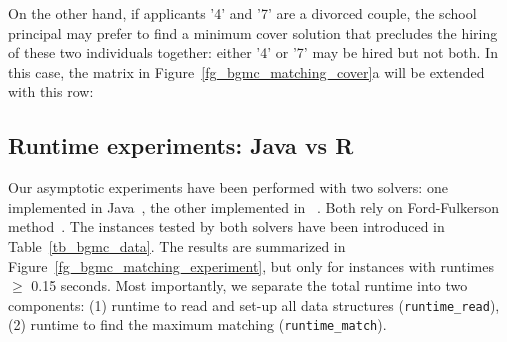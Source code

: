 On the other hand,  if applicants '4' and '7' are a divorced couple,
the school principal may prefer to find a minimum cover solution that
precludes the hiring of these two individuals together: either 
'4' or '7' may be hired but not both. In this case, 
the matrix in Figure~\ref{fg_bgmc_matching_cover}a 
will be extended with this row:
\\[1.5ex]
\hspace*{14ex}{\tt -4 ~~-7}

\subsection{{\sf Runtime experiments: Java vs R}}
\noindent
Our asymptotic experiments have been performed
with two solvers:
one implemented in Java~\cite{OPUS-matching-2021-geeksforgeeks-java}, 
the other implemented in \R{}~\cite{OPUS-matching-2021-igraph-R}.
Both rely on Ford-Fulkerson method~\cite{OPUS-matching-1956-Math-Ford_Fulkerson-max_flows}. The instances tested by both solvers have been introduced in
Table~\ref{tb_bgmc_data}. 
The results are summarized
in Figure~\ref{fg_bgmc_matching_experiment}, but only for instances with runtimes $\ge$ 0.15 seconds.
Most importantly, we separate the total runtime into two components:
(1) runtime to read and set-up all data structures ({\tt runtime\_read}),
(2) runtime to find the maximum matching ({\tt runtime\_match}).

